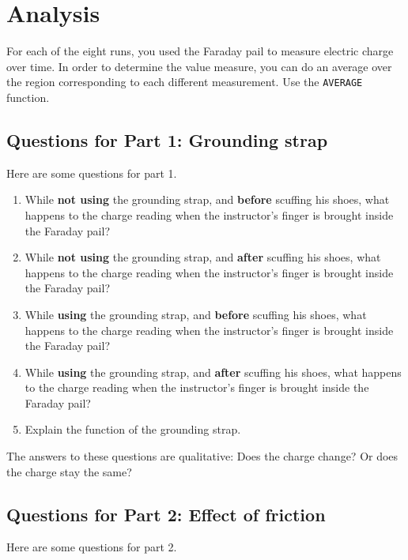 \section{Analysis}
For each of the eight runs, you used the Faraday pail to measure electric charge over time. In order to determine the value measure, you can do an average over the region corresponding to each different measurement. Use the \texttt{AVERAGE} function.
\subsection{Questions for Part 1: Grounding strap}
Here are some questions for part 1.
\begin{enumerate}
	\item While \textbf{not using} the grounding strap, and \textbf{before} scuffing his shoes, what happens to the charge reading when the instructor's finger is brought inside the Faraday pail?
	\item While \textbf{not using} the grounding strap, and \textbf{after} scuffing his shoes, what happens to the charge reading when the instructor's finger is brought inside the Faraday pail?
	\item While \textbf{using} the grounding strap, and \textbf{before} scuffing his shoes, what happens to the charge reading when the instructor's finger is brought inside the Faraday pail?
	\item While \textbf{using} the grounding strap, and \textbf{after} scuffing his shoes, what happens to the charge reading when the instructor's finger is brought inside the Faraday pail?
	\item Explain the function of the grounding strap.
\end{enumerate}
The answers to these questions are qualitative: Does the charge change? Or does the charge stay the same?
\subsection{Questions for Part 2: Effect of friction}
Here are some questions for part 2.
